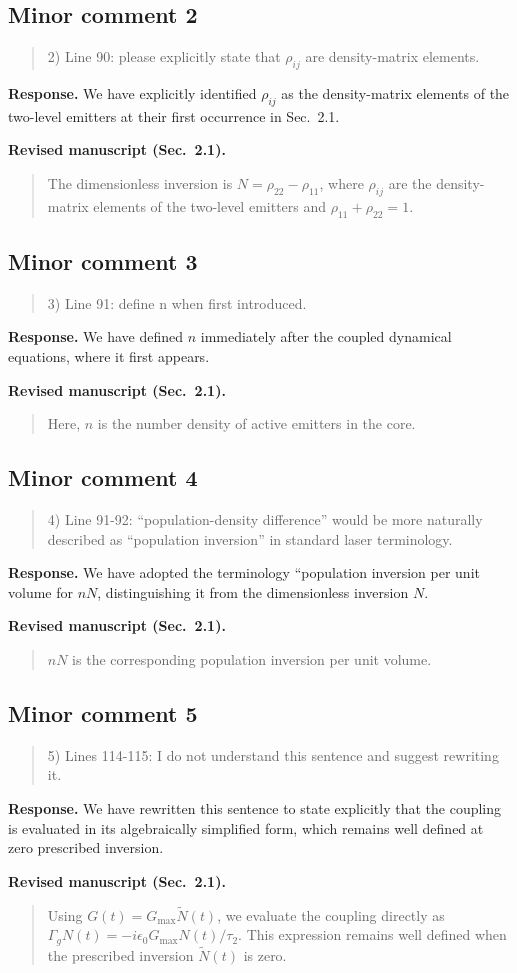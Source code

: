 \documentclass[11pt,a4paper]{article}
\newif\ifshowrevisions
\newcommand{\minorrevised}[1]{{\ifshowrevisions\color{revisiongreen}\fi #1}}
\newcommand{\reviewercomment}[1]{\begin{quote}\small #1\end{quote}}
\newcommand{\response}[1]{\par\textbf{Response.} #1\par}
\newcommand{\minormanuscripttext}[2]{\par\textbf{Revised manuscript (#1).}\begin{quote}\minorrevised{#2}\end{quote}}
\begin{document}
\subsection*{Minor comment 2}
\label{r1-minor-2}
\reviewercomment{
2) Line 90: please explicitly state that $\rho_{ij}$ are density-matrix elements.
}
\response{We have explicitly identified $\rho_{ij}$ as the density-matrix elements of the two-level emitters at their first occurrence in Sec.~2.1.}
\minormanuscripttext{Sec.~2.1}{The dimensionless inversion is $N=\rho_{22}-\rho_{11}$, where $\rho_{ij}$ are the density-matrix elements of the two-level emitters and $\rho_{11}+\rho_{22}=1$.}


\subsection*{Minor comment 3}
\label{r1-minor-3}
\reviewercomment{
3) Line 91: define n when first introduced.
}
\response{We have defined $n$ immediately after the coupled dynamical equations, where it first appears.}
\minormanuscripttext{Sec.~2.1}{Here, $n$ is the number density of active emitters in the core.}


\subsection*{Minor comment 4}
\label{r1-minor-4}
\reviewercomment{
4) Line 91-92: “population-density difference” would be more naturally described as “population inversion” in standard laser terminology.
}
\response{We have adopted the terminology ``population inversion per unit volume for $nN$, distinguishing it from the dimensionless inversion $N$.}
\minormanuscripttext{Sec.~2.1}{$nN$ is the corresponding population inversion per unit volume.}


\subsection*{Minor comment 5}
\label{r1-minor-5}
\reviewercomment{
5) Lines 114-115: I do not understand this sentence and suggest rewriting it.
}
\response{We have rewritten this sentence to state explicitly that the coupling is evaluated in its algebraically simplified form, which remains well defined at zero prescribed inversion.}
\minormanuscripttext{Sec.~2.1}{Using $G(t)=G_{\max}\widetilde N(t)$, we evaluate the coupling directly as $\Gamma_gN(t)=-i\epsilon_0G_{\max}N(t)/\tau_2$. This expression remains well defined when the prescribed inversion $\widetilde N(t)$ is zero.}
\end{document}
